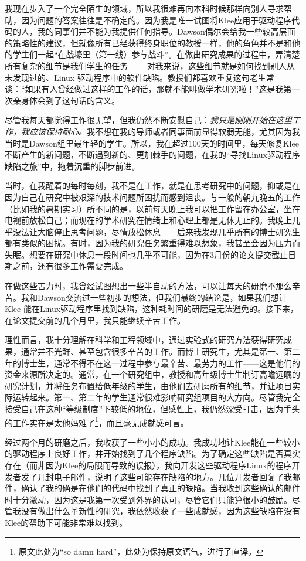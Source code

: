 \documentclass[letter,12pt]{book}
\begin{document}
\begin{CJK}{UTF8}{gbsn}
我现在步入了一个完全陌生的领域，所以我很难再向本科时候那样向别人寻求帮助，因为问题的答案往往是不确定的。因为我是唯一试图将Klee应用于驱动程序代码的人，我的同事们并不能为我提供任何指导。Dawson偶尔会给我一些较高层面的策略性的建议，但就像所有已经获得终身职位的教授一样，他的角色并不是和他的学生们一起“在战壕里（第一线）参与战斗”。在做出研究成果的过程中，弄清楚所有复杂的细节是我们学生的任务—— 对我来说，这些细节就是如何找到别人从未发现过的、Linux 驱动程序中的软件缺陷。教授们都喜欢重复这句老生常谈：“如果有人曾经做过这样的工作的话，那就不能叫做学术研究啦！”这是我第一次亲身体会到了这句话的含义。

尽管我每天都觉得工作很无望，但我仍然不断安慰自己：\emph{我只是刚刚开始在这里工作，我应该保持耐心。}我不想在我的导师或者同事面前显得软弱无能，尤其因为我当时是Dawson组里最年轻的学生。所以，我在超过100天的时间里，每天修复Klee不断产生的新问题，不断遇到新的、更加棘手的问题，在我的“寻找Linux驱动程序缺陷之旅”中，拖着沉重的脚步前进。

当时，在我醒着的每时每刻，我不是在工作，就是在思考研究中的问题，抑或是在因为自己在研究中被艰深的技术问题所困扰而感到沮丧。与一般的朝九晚五的工作（比如我的暑期实习）所不同的是，以前每天晚上我可以把工作留在办公室，坐在电视前放松自己；而现在的学术研究在情绪上和心理上都是无休无止的。我晚上几乎没法让大脑停止思考问题，尽情放松休息——后来我发现几乎所有的博士研究生都有类似的困扰。有时，因为我的研究任务繁重得难以想象，我甚至会因为压力而失眠。想要在研究中休息一段时间也几乎不可能，因为在3月份的论文提交截止日期之前，还有很多工作需要完成。

在做这些苦力时，我曾经试图想出一些半自动的方法，可以让每天的研磨不那么辛苦。我和Dawson交流过一些初步的想法，但我们最终的结论是，如果我们想让Klee 能在Linux驱动程序里找到缺陷，这种耗时间的研磨是无法避免的。接下来，在论文提交前的几个月里，我只能继续辛苦工作。

理性而言，我十分理解在科学和工程领域中，通过实验式的研究方法获得研究成果，通常并不光鲜、甚至包含很多辛苦的工作。而博士研究生，尤其是第一、第二年的博士生，通常不得不在这一过程中参与最辛苦、最劳力的工作——这是他们的资金来源所决定的。通常，在一个研究组中，教授和高年级博士生制订高瞻远瞩的研究计划，并将任务布置给低年级的学生，由他们去研磨所有的细节，并让项目实际运转起来。第一、第二年的学生通常很难影响研究组项目的大方向。尽管我完全接受自己在这种“等级制度”下较低的地位，但感性上，我仍然深受打击，因为手头的工作实在是太他妈难了\footnote{原文此处为“so damn hard”，此处为保持原文语气，进行了直译。}，而且毫无成就感可言。

\breakline

经过两个月的研磨之后，我收获了一些小小的成功。我成功地让Klee能在一些较小的驱动程序上良好工作，并开始找到了几个程序缺陷。为了确定这些缺陷是否真实存在（而非因为Klee的局限而导致的误报），我向开发这些驱动程序Linux的程序开发者发了几封电子邮件，说明了这些可能存在缺陷的地方。几位开发者回复了我邮件，确认了我的确是在他们的代码中找到了真正的缺陷。当我收到这些确认的邮件时十分激动，因为这是我第一次受到外界的认可，尽管它们只能算很小的鼓励。尽管我没有做出什么革新性的研究，我依然收获了一些成就感，因为这些缺陷在没有Klee的帮助下可能非常难以找到。


\end{CJK}
\end{document}
